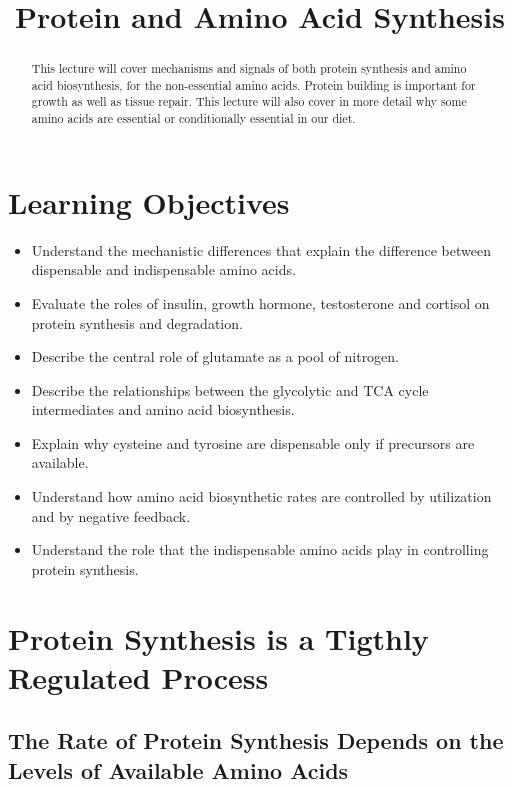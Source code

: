 \documentclass{tufte-handout}
\title{Protein and Amino Acid Synthesis}
\author{}
\date{}  %
\begin{document}
\maketitle%

\begin{abstract}
\noindent This lecture will cover mechanisms and signals of both protein synthesis and amino acid biosynthesis, for the non-essential amino acids.  Protein building is important for growth as well as tissue repair.  This lecture will also cover in more detail why some amino acids are essential or conditionally essential in our diet.
\end{abstract}

\tableofcontents

\pagebreak
\section{Learning Objectives}

\begin{itemize}
\item Understand the mechanistic differences that explain the difference between dispensable and indispensable amino acids.
\item Evaluate the roles of insulin, growth hormone, testosterone and cortisol on protein synthesis and degradation.
\item Describe the central role of glutamate as a pool of nitrogen.
\item Describe the relationships between the glycolytic and TCA cycle intermediates and amino acid biosynthesis.
\item Explain why cysteine and tyrosine are dispensable only if precursors are available.
\item Understand how amino acid biosynthetic rates are controlled by utilization and by negative feedback.
\item Understand the role that the indispensable amino acids play in controlling protein synthesis.
\end{itemize}

\section{Protein Synthesis is a Tigthly Regulated Process}

\subsection{The Rate of Protein Synthesis Depends on the Levels of Available Amino Acids}
\end{document}
